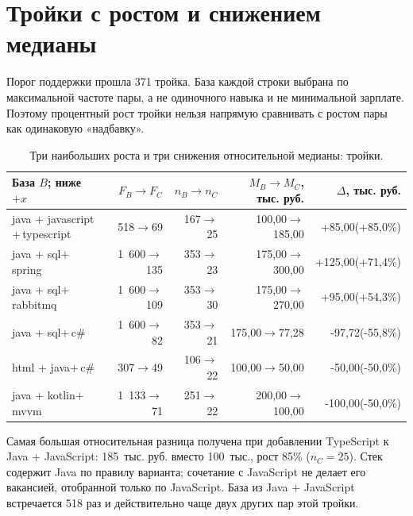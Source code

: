 \documentclass[11pt,a4paper]{article}
\begin{document}
\section{Тройки с ростом и снижением медианы}
Порог поддержки прошла 371 тройка. База каждой строки выбрана по максимальной частоте пары, а не одиночного навыка и не минимальной зарплате. Поэтому процентный рост тройки нельзя напрямую сравнивать с ростом пары как одинаковую «надбавку».
\begin{table}[h!]
\centering\small
\caption{Три наибольших роста и три снижения относительной медианы: тройки.}
\begin{tabularx}{\linewidth}{>{\raggedright\arraybackslash}Xrrrr}\toprule
База $B$; ниже $+x$ & $F_B\to F_C$ & $n_B\to n_C$ & $M_B\to M_C$, тыс. руб. & $\Delta$, тыс. руб.\\\midrule
java + javascript\newline $+\,$typescript & 518$\to$69 & 167$\to$25 & 100,00$\to$185,00 & +85,00\newline (+85,0\%)\\
java + sql\newline $+\,$spring & 1~600$\to$135 & 353$\to$23 & 175,00$\to$300,00 & +125,00\newline (+71,4\%)\\
java + sql\newline $+\,$rabbitmq & 1~600$\to$109 & 353$\to$30 & 175,00$\to$270,00 & +95,00\newline (+54,3\%)\\
java + sql\newline $+\,$c\# & 1~600$\to$82 & 353$\to$21 & 175,00$\to$77,28 & -97,72\newline (-55,8\%)\\
html + java\newline $+\,$c\# & 307$\to$49 & 106$\to$22 & 100,00$\to$50,00 & -50,00\newline (-50,0\%)\\
java + kotlin\newline $+\,$mvvm & 1~133$\to$71 & 251$\to$22 & 200,00$\to$100,00 & -100,00\newline (-50,0\%)\\
\bottomrule\end{tabularx}
\end{table}

Самая большая относительная разница получена при добавлении TypeScript к Java + JavaScript: 185~тыс. руб. вместо 100~тыс., рост 85\% ($n_C=25$). Стек содержит Java по правилу варианта; сочетание с JavaScript не делает его вакансией, отобранной только по JavaScript. База из Java + JavaScript встречается 518 раз и действительно чаще двух других пар этой тройки.
\end{document}
